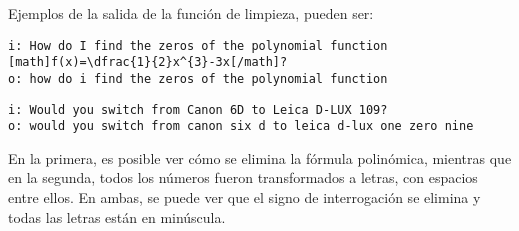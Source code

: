 \bigskip Ejemplos de la salida de la función de limpieza, pueden ser:

\begin{verbatim}
i: How do I find the zeros of the polynomial function
[math]f(x)=\dfrac{1}{2}x^{3}-3x[/math]?
o: how do i find the zeros of the polynomial function
\end{verbatim}

\begin{verbatim}
i: Would you switch from Canon 6D to Leica D-LUX 109?
o: would you switch from canon six d to leica d-lux one zero nine
\end{verbatim}

En la primera, es posible ver cómo se elimina la fórmula polinómica, mientras que en la segunda, todos los números fueron transformados a letras, con espacios entre ellos. En ambas, se puede ver que el signo de interrogación se elimina y todas las letras están en minúscula.
